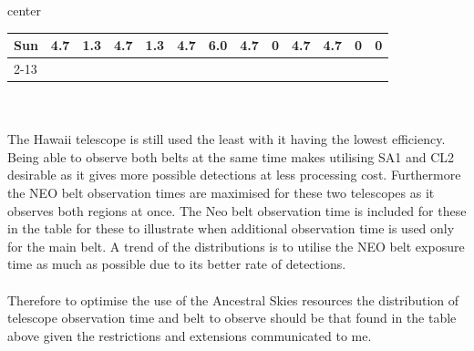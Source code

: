 \documentclass{article}
\begin{document}
\begin{adjustbox}{center}
\begin{tabular}{lcccccccccccc}
	\multicolumn{1}{l|}{{ Sun}}                                       & \multicolumn{1}{c|}{{ 4.7}}                                  & \multicolumn{1}{c|}{{ 1.3}}                                   & \multicolumn{1}{c|}{{ 4.7}}                                  & \multicolumn{1}{c|}{{ 1.3}}                                   & \multicolumn{1}{c|}{{ 4.7}}                                  & \multicolumn{1}{c|}{{ 6.0}}                                   & \multicolumn{1}{c|}{{ 4.7}}                                  & \multicolumn{1}{c|}{{ 0}}                                     & \multicolumn{1}{c|}{{ 4.7}}                                  & \multicolumn{1}{c|}{{ 4.7}}                                   & \multicolumn{1}{c|}{{ 0}}                                    & \multicolumn{1}{c|}{{ 0}}                                     \\ \cline{2-13} 
	\end{tabular}
\end{adjustbox}
\\\\
The Hawaii telescope is still used the least with it having the lowest efficiency. Being able to observe both belts at the same time makes utilising
SA1 and CL2 desirable as it gives more possible detections at less processing cost. Furthermore the NEO belt observation times are maximised for these two telescopes as it 
observes both regions at once. The Neo belt observation time is included for these in the table for these to illustrate when additional observation time is used only for the main belt.
A trend of the distributions is to utilise the NEO belt exposure time as much as possible due to its better rate of detections.
\\\\
Therefore to optimise the use of the Ancestral Skies resources the distribution of telescope observation time and belt to observe
should be that found in the table above given the restrictions and extensions communicated to me.
\end{document}
